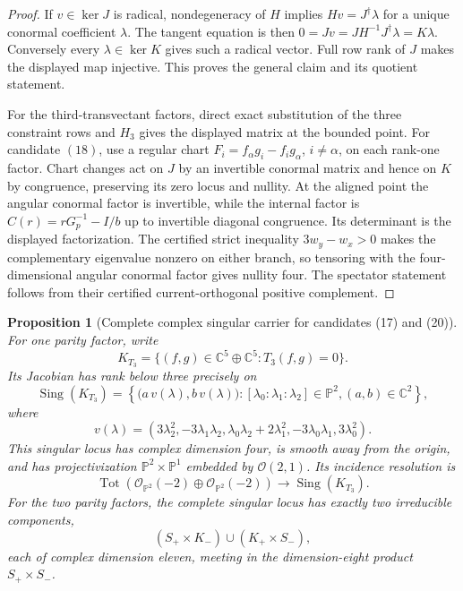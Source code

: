 \documentclass[11pt]{article}
\newtheorem{proposition}[theorem]{Proposition}
\theoremstyle{definition}
\theoremstyle{remark}
\begin{document}
\begin{proof}
If \(v\in\ker J\) is radical, nondegeneracy of \(H\) implies
\(Hv=J^\dagger\lambda\) for a unique conormal coefficient \(\lambda\).
The tangent equation is then
\(0=Jv=JH^{-1}J^\dagger\lambda=K\lambda\).
Conversely every \(\lambda\in\ker K\) gives such a radical vector.  Full row
rank of \(J\) makes the displayed map injective.  This proves the general
claim and its quotient statement.

For the third-transvectant factors, direct exact substitution of the three
constraint rows and \(H_3\) gives the displayed matrix at the bounded point.
For candidate \((18)\), use a regular chart
\(F_i=f_\alpha g_i-f_i g_\alpha\), \(i\ne\alpha\), on each rank-one factor.
Chart changes act on \(J\) by an invertible conormal matrix and hence on
\(K\) by congruence, preserving its zero locus and nullity.  At the aligned
point the angular conormal factor is invertible, while the internal factor is
\(C(r)=rG_p^{-1}-I/b\) up to invertible diagonal congruence.  Its determinant
is the displayed factorization.  The certified strict inequality
\(3w_y-w_x>0\) makes the complementary eigenvalue nonzero on either branch,
so tensoring with the four-dimensional angular conormal factor gives nullity
four.  The spectator statement follows from their certified
current-orthogonal positive complement.
\end{proof}

\begin{proposition}[Complete complex singular carrier for candidates (17) and (20)]
\label{prop:third-transvectant-singular-locus}
For one parity factor, write
\[
 K_{T_3}=\{(f,g)\in\mathbb C^5\oplus\mathbb C^5:T_3(f,g)=0\}.
\]
Its Jacobian has rank below three precisely on
\[
 \operatorname{Sing}(K_{T_3})
 =
 \left\{
 \bigl(a\,v(\lambda),b\,v(\lambda)\bigr):
 [\lambda_0:\lambda_1:\lambda_2]\in\mathbb P^2,
 (a,b)\in\mathbb C^2
 \right\},
\]
where
\[
 v(\lambda)=
 \left(
 3\lambda_2^2,-3\lambda_1\lambda_2,
 \lambda_0\lambda_2+2\lambda_1^2,
 -3\lambda_0\lambda_1,3\lambda_0^2
 \right).
\]
This singular locus has complex dimension four, is smooth away from the
origin, and has projectivization \(\mathbb P^2\times\mathbb P^1\) embedded
by \(\mathcal O(2,1)\).  Its incidence resolution is
\[
 \operatorname{Tot}\!\left(
 \mathcal O_{\mathbb P^2}(-2)\oplus
 \mathcal O_{\mathbb P^2}(-2)
 \right)\longrightarrow\operatorname{Sing}(K_{T_3}).
\]
For the two parity factors, the complete singular locus has exactly two
irreducible components,
\[
 (S_+\times K_-)\cup(K_+\times S_-),
\]
each of complex dimension eleven, meeting in the dimension-eight product
\(S_+\times S_-\).
\end{proposition}
\end{document}

